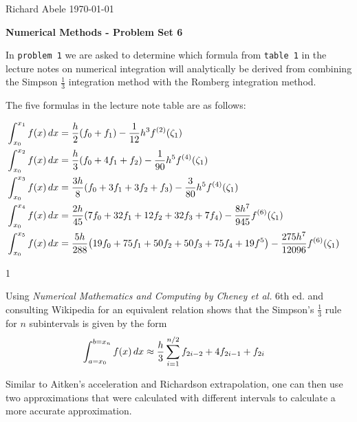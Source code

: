\documentclass[12pt]{article}
\newenvironment{ex}[2][Exercise]{\begin{trivlist}
\item[\hskip \labelsep {\bfseries #1}\hskip \labelsep {\bfseries #2.}]}{\end{trivlist}}
\newenvironment{sol}[1][Solution]{\begin{trivlist}
\item[\hskip \labelsep {\bfseries #1:}]}{\end{trivlist}}
\DeclarePairedDelimiter\rb{(}{)}
\begin{document}
\noindent Richard Abele \hfill \today \\[30pt]
\centerline{ \Large{ \textbf{ Numerical Methods - Problem Set 6 }}}

\begin{ex}
    1 
\end{ex}
In \texttt{problem 1} we are asked to determine which formula from \texttt{table 1} in the lecture notes on numerical integration will analytically be derived from combining the Simpson \(\frac{1}{3}\) integration method with the Romberg integration method. 

The five formulas in the lecture note table are as follows: 

\begin{align}
    \int_{x_{0}}^{x_{1}} {f \rb*{x}} \,d x & = \frac{h}{2} \rb*{f_{0} + f_{1}} - \frac{1}{12} h^{3} f^{\rb*{2}} \rb*{ \zeta_{1}} &\\
    \int_{x_{0}}^{x_{2}} {f \rb*{x}} \,d x & = 
    \frac{h}{3} \rb*{f_{0} + 4 f_{1} + f_{2}} - \frac{1}{90} h^{5} f^{\rb*{4}} \rb*{\zeta_{1}} &\\
    \int_{x_{0}}^{x_{3}} {f \rb*{x}} \,d x & = 
    \frac{3h}{8} \rb*{f_{0} + 3 f_{1} + 3 f_{2} + f_{3}} - \frac{3}{80} h^{5} f^{\rb*{4}} \rb*{\zeta_{1}} &\\
    \int_{x_{0}}^{x_{4}} {f \rb*{x}} \,d x & = 
    \frac{2h}{45} \rb*{7 f_{0} + 32 f_{1} + 12 f_{2} + 32 f_{3} + 7 f_{4}} - \frac{8 h^{7}}{945} f^{\rb*{6}} \rb*{ \zeta_{1}} &\\
    \int_{x_{0}}^{x_{5}} {f \rb*{x}} \,d x & = 
    \frac{5 h}{288} \rb*{19 f_{0} + 75 f_{1} + 50 f_{2} + 50 f_{3} + 75 f_{4} + 19 f^{5}} - \frac{275 h^{7}}{12096} f^{\rb*{6}} \rb*{\zeta_{1}}
\end{align}

\begin{sol} 1 \end{sol}

Using \textit{Numerical Mathematics and Computing by Cheney et al.} 6th ed. and consulting Wikipedia for an equivalent relation shows that the Simpson's \(\frac{1}{3}\) rule for \(n\) subintervals is given by the form
\begin{align*}
    \int_{a = x_{0}}^{b = x_{n}} { f \rb*{x}} \,d x & \approx
    \frac{h}{3} \sum_{i = 1}^{n/2} { f_{2i -2} + 4 f_{2i-1} + f_{2i}} &\\
\end{align*}

Similar to Aitken's acceleration and Richardson extrapolation, one can then use two approximations that were calculated with different intervals to calculate a more accurate approximation. 
\end{document}
